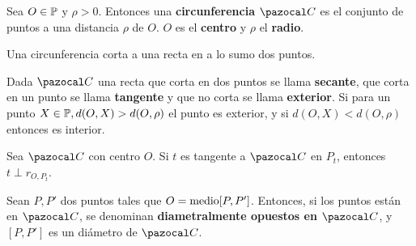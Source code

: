  Sea $O \in \P$ y $\rho > 0$. Entonces una \textbf{circunferencia} $\C$ es el conjunto de puntos a una distancia $\rho$ de $O$. $O$ es el \textbf{centro} y $\rho$ el \textbf{radio}.

 Una circunferencia corta a una recta en a lo sumo dos puntos.

 Dada $\C$ una recta que corta en dos puntos se llama \textbf{secante}, que corta en un punto se llama \textbf{tangente} y que no corta se llama \textbf{exterior}. Si para un punto $X \in \P, d(O,X) > d(O,\rho)$ el punto es exterior, y si $d(O,X) < d(O, \rho)$ entonces es interior.

 Sea $\C$ con centro $O$. Si $t$ es tangente a $\C$ en $P_t$, entonces $t \perp r_{O,P_t}$.

 Sean $P, P'$ dos puntos tales que $O =  \m[P,P']$. Entonces, si los puntos están en $\C$, se denominan \textbf{diametralmente opuestos en $\C$}, y $[P,P']$ es un diámetro de $\C$.

